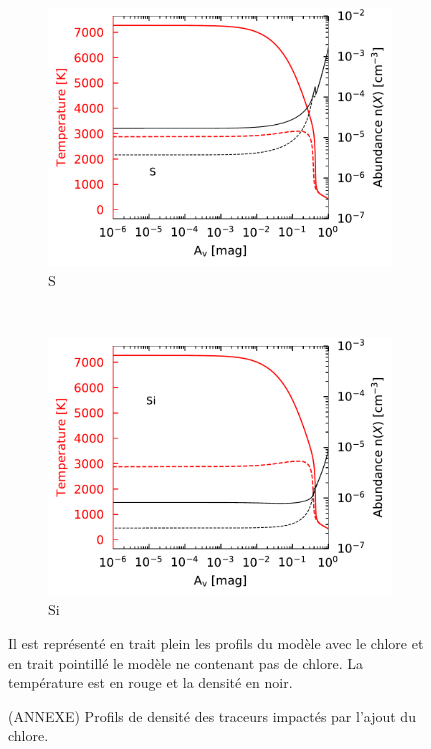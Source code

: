 \begin{figure}[!htbp]
    \begin{subfigure}[t]{0.49\textwidth} %
        \centering \includegraphics[trim = {0 0 0 0},clip,width=1\textwidth]{figure/Cl/gridModelEmiss/nT_comp_S.pdf}
        \caption{$\mathrm{S}$}
    \end{subfigure}
    ~
    \begin{subfigure}[t]{0.49\textwidth} %
        \centering \includegraphics[trim = {0 0 0 0},clip,width=1\textwidth]{figure/Cl/gridModelEmiss/nT_comp_Si.pdf}
        \caption{$\mathrm{Si}$}
    \end{subfigure}
    
    \caption{(ANNEXE) Profils de densité des traceurs impactés par l'ajout du chlore.}
    \begin{minipage}{\textwidth}
    Il est représenté en trait plein les profils du modèle avec le chlore et en trait pointillé le modèle ne contenant pas de chlore. La température est en rouge et la densité en noir.
    \end{minipage}
    \label{fig:Cl:gridModelEmiss:nT:yes}
\end{figure}

